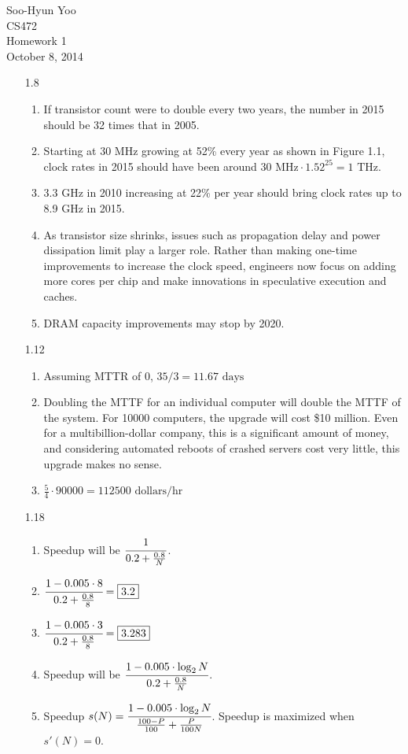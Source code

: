 \documentclass[12pt,letterpaper]{article}
\begin{document}
Soo-Hyun Yoo \\
CS472 \\
Homework 1\\
October 8, 2014

\begin{enumerate}
	\item[1.8]
		\begin{enumerate}
			\item If transistor count were to double every two years, the
				number in 2015 should be 32 times that in 2005.
			\item Starting at 30 MHz growing at 52\% every year as shown in
				Figure 1.1, clock rates in 2015 should have been around
				$30\text{ MHz} \cdot 1.52^{25} = 1\text{ THz}$.
			\item 3.3 GHz in 2010 increasing at 22\% per year should bring
				clock rates up to 8.9 GHz in 2015.
			\item As transistor size shrinks, issues such as propagation delay
				and power dissipation limit play a larger role. Rather than
				making one-time improvements to increase the clock speed,
				engineers now focus on adding more cores per chip and make
				innovations in speculative execution and caches.
			\item DRAM capacity improvements may stop by 2020.
		\end{enumerate}
	\item[1.12]
		\begin{enumerate}
			\item Assuming MTTR of 0, $35/3 = 11.67\text{ days}$
			\item Doubling the MTTF for an individual computer will double the
				MTTF of the system. For 10000 computers, the upgrade will cost
				\$10 million. Even for a multibillion-dollar company, this is
				a significant amount of money, and considering automated
				reboots of crashed servers cost very little, this upgrade makes
				no sense.
			\item $\frac{5}{4} \cdot 90000 = 112500\text{ dollars/hr}$
		\end{enumerate}
	\item[1.18]
		\begin{enumerate}
			\item Speedup will be $\cfrac{1}{0.2 + \frac{0.8}{N}}$.
			\item $\cfrac{1 - 0.005\cdot8}{0.2 + \frac{0.8}{8}} = \boxed{3.2}$
			\item $\cfrac{1 - 0.005\cdot3}{0.2 + \frac{0.8}{8}} = \boxed{3.283}$
			\item Speedup will be $\cfrac{1 - 0.005\cdot\log_2N}{0.2 + \frac{0.8}{N}}$.
			\item Speedup $s(N) = \cfrac{1 - 0.005\cdot\log_2N}{\frac{100-P}{100} + \frac{P}{100N}}$. Speedup is maximized when $s'(N) = 0$.
		\end{enumerate}
\end{enumerate}
\end{document}
